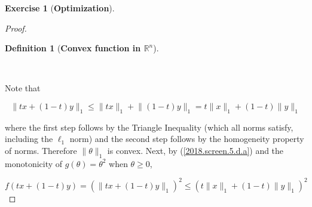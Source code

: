 \documentclass{article}
\theoremstyle{definition}
\newtheorem{exercise}{Exercise}
\newtheorem{definition}{Definition}
\theoremstyle{definition}
\theoremstyle{definition}
\theoremstyle{definition}
\begin{document}
\begin{exercise}[\textbf{Optimization}]
\begin{enumerate}[(a)]
\begin{proof}
\begin{center}
{{\begin{definition}[\textbf{Convex function in \(\mathbb{R}^n\)}]
\end{definition}

}
}
\end{center}

\

%
%
%
%
%
%
%
%
%
%

Note that

\begin{equation}\label{2018.screen.5.d.a}
\lVert tx+(1-t)y \rVert_1 \leq \lVert tx \rVert_1  + \lVert (1-t)y \rVert_1 = t \lVert x \rVert_1  + (1-t) \lVert y \rVert_1 
\end{equation}

where the first step follows by the Triangle Inequality (which all norms satisfy, including the \(\ell_1\) norm) and the second step follows by the homogeneity property of norms. Therefore \(\lVert \theta \rVert_1\) is convex. Next, by (\ref{2018.screen.5.d.a}) and the monotonicity of \(g(\theta) = \theta^2\) when \(\theta \geq 0\),


\[
f(tx+(1-t)y) = \left( \lVert tx+(1-t)y \rVert_1 \right)^2 \leq \left(  t \lVert x \rVert_1  + (1-t) \lVert y \rVert_1  \right)^2 
\]


\end{proof}
\end{enumerate}
\end{exercise}
\end{document}
